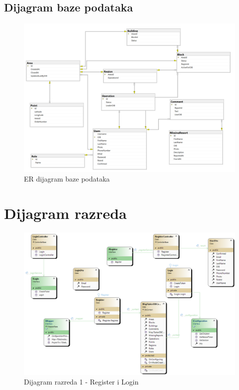 			\subsection{Dijagram baze podataka}
				\begin{figure}[H]
					\includegraphics[width=15cm]{./slike/ERDijagram.png}
					 \centering
					 \caption{ER dijagram baze podataka}
				\end{figure}
			\eject
			
			
		\section{Dijagram razreda}
								
			\begin{figure}[h!] \includegraphics[width=\linewidth]{dijagrami/CD-LoginRegister.png}
				\caption{Dijagram razreda 1 - Register i Login}
			\end{figure}
		
